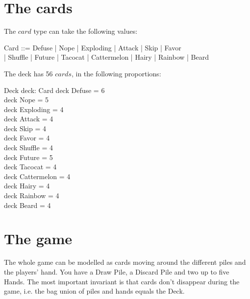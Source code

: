\documentclass[11pt, fuzz]{article}
\begin{document}

\section{The cards}

The $card$ type can take the following values:

\begin{zed}
    Card ::= Defuse | Nope | Exploding | Attack | Skip | Favor \\| Shuffle | Future | Tacocat | Cattermelon | Hairy | Rainbow | Beard
\end{zed}

The deck has 56 $cards$, in the following proportions:

\begin{schema}{Deck}
    deck: \bag Card
\where
    deck \bcount Defuse      = 6 \\
    deck \bcount Nope        = 5 \\
    deck \bcount Exploding   = 4 \\
    deck \bcount Attack      = 4 \\
    deck \bcount Skip        = 4 \\
    deck \bcount Favor       = 4 \\
    deck \bcount Shuffle     = 4 \\
    deck \bcount Future      = 5 \\
    deck \bcount Tacocat     = 4 \\
    deck \bcount Cattermelon = 4 \\
    deck \bcount Hairy       = 4 \\
    deck \bcount Rainbow     = 4 \\
    deck \bcount Beard       = 4 \\
\end{schema}



\section{The game}

The whole game can be modelled as cards moving around the different piles and the players' hand. You have a Draw Pile, a Discard Pile and two up to five Hands. The most important invariant is that cards don't disappear during the game, i.e. the bag union of piles and hands equals the Deck. 
\end{document}
